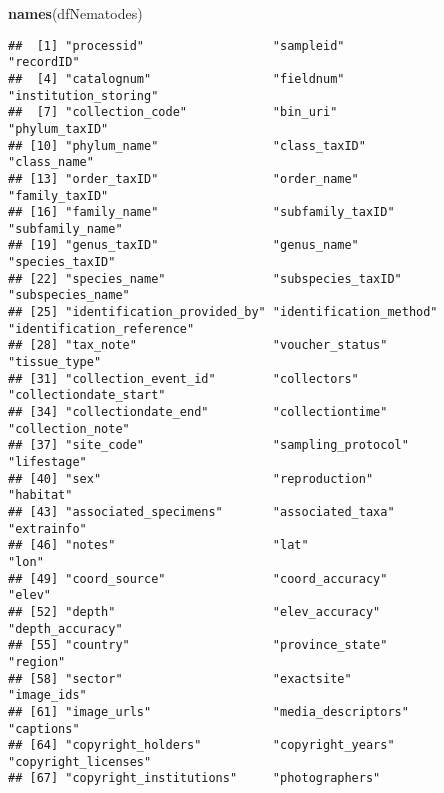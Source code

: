 \documentclass[
]{article}
\newenvironment{Shaded}{\begin{snugshade}}{\end{snugshade}}
\newcommand{\FunctionTok}[1]{\textcolor[rgb]{0.13,0.29,0.53}{\textbf{#1}}}
\newcommand{\NormalTok}[1]{#1}
\begin{document}
\begin{Shaded}
\begin{Highlighting}[]
\FunctionTok{names}\NormalTok{(dfNematodes)}
\end{Highlighting}
\end{Shaded}

\begin{verbatim}
##  [1] "processid"                  "sampleid"                   "recordID"                  
##  [4] "catalognum"                 "fieldnum"                   "institution_storing"       
##  [7] "collection_code"            "bin_uri"                    "phylum_taxID"              
## [10] "phylum_name"                "class_taxID"                "class_name"                
## [13] "order_taxID"                "order_name"                 "family_taxID"              
## [16] "family_name"                "subfamily_taxID"            "subfamily_name"            
## [19] "genus_taxID"                "genus_name"                 "species_taxID"             
## [22] "species_name"               "subspecies_taxID"           "subspecies_name"           
## [25] "identification_provided_by" "identification_method"      "identification_reference"  
## [28] "tax_note"                   "voucher_status"             "tissue_type"               
## [31] "collection_event_id"        "collectors"                 "collectiondate_start"      
## [34] "collectiondate_end"         "collectiontime"             "collection_note"           
## [37] "site_code"                  "sampling_protocol"          "lifestage"                 
## [40] "sex"                        "reproduction"               "habitat"                   
## [43] "associated_specimens"       "associated_taxa"            "extrainfo"                 
## [46] "notes"                      "lat"                        "lon"                       
## [49] "coord_source"               "coord_accuracy"             "elev"                      
## [52] "depth"                      "elev_accuracy"              "depth_accuracy"            
## [55] "country"                    "province_state"             "region"                    
## [58] "sector"                     "exactsite"                  "image_ids"                 
## [61] "image_urls"                 "media_descriptors"          "captions"                  
## [64] "copyright_holders"          "copyright_years"            "copyright_licenses"        
## [67] "copyright_institutions"     "photographers"
\end{verbatim}
\end{document}
